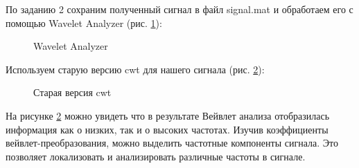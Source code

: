 \documentclass[a4paper,oneside,14pt]{extreport}
\begin{document}
\newpage
По заданию 2 сохраним полученный сигнал в файл signal.mat и обработаем его с помощью Wavelet Analyzer (рис. \ref{task5}):

\begin{figure}[!h]
	\caption{Wavelet Analyzer}
	\label{task5}
\end{figure}

Используем старую версию cwt для нашего сигнала (рис. \ref{task2}):

\begin{figure}[!h]
	\caption{Старая версия cwt}
	\label{task2}
\end{figure}

\newpage
На рисунке \ref{task2} можно увидеть что в результате Вейвлет анализа отобразилась информация как о низких, так и о высоких частотах. Изучив коэффициенты вейвлет-преобразования, можно выделить частотные компоненты сигнала. Это позволяет локализовать и анализировать различные частоты в сигнале.
\end{document}
